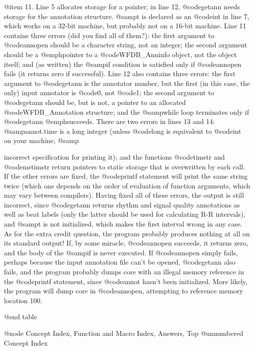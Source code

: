 {{{{{{{{{@item 11.
Line 5 allocates storage for a pointer; in line 12, @code{getann} needs
storage for the annotation structure.  @samp{t} is declared as an
@code{int} in line 7, which works on a 32-bit machine, but probably not
on a 16-bit machine.  Line 11 contains three errors (did you find all of
them?): the first argument to @code{annopen} should be a character
string, not an integer; the second argument should be a @emph{pointer}
to a @code{WFDB_Anninfo} object, not the object itself; and (as written)
the @samp{if} condition is satisfied only if @code{annopen} fails (it
returns zero if successful).  Line 12 also contains three errors: the
first argument to @code{getann} is the annotator number, but the first
(in this case, the only) input annotator is @code{0}, not @code{1}; the
second argument to @code{getann} should be, but is not, a pointer to an
allocated @code{WFDB_Annotation} structure; and the @samp{while} loop
terminates only if @code{getann} @emph{succeeds}.  There are two errors
in lines 13 and 14: @samp{annot.time} is a long integer (unless
@code{long} is equivalent to @code{int} on your machine, @samp{%
incorrect specification for printing it); and the functions
@code{timstr} and @code{mstimstr} return pointers to static storage that
is overwritten by each call.  If the other errors are fixed, the
@code{printf} statement will print the same string twice (which one
depends on the order of evaluation of function arguments, which may vary
between compilers).  Having fixed all of these errors, the output is
still incorrect, since @code{getann} returns rhythm and signal quality
annotations as well as beat labels (only the latter should be used for
calculating R-R intervals), and @samp{t} is not initialized, which makes
the first interval wrong in any case.  As for the extra credit question,
the program probably produces nothing at all on its standard output!
If, by some miracle, @code{annopen} succeeds, it returns zero, and the
body of the @samp{if} is never executed.  If @code{annopen} simply
fails, perhaps because the input annotation file can't be opened,
@code{getann} also fails, and the program probably dumps core with an
illegal memory reference in the @code{printf} statement, since
@code{annot} hasn't been initialized.  More likely, the program will
dump core in @code{annopen}, attempting to reference memory location
100.

@end table

@node     Concept Index, Function and Macro Index, Answers, Top
@unnumbered Concept Index

}}}}}}}}}}
